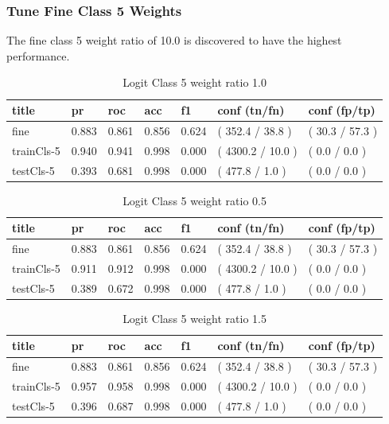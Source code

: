\documentclass[ms]{nuthesis}
\begin{document}
\subsubsection{Tune Fine Class 5 Weights}
\par The fine class 5 weight ratio of 10.0 is discovered to have the highest performance.
\FloatBarrier
\begin{table}[H]
\centering
\caption{Logit Class 5 weight ratio 1.0}
\label{tab:LogRegCls5-Wt1}
\begin{tabular}{|l||l||l||l||l||l||l|}\toprule
title & pr & roc & acc & f1 & conf (tn/fn) & conf (fp/tp) \\ \midrule
fine & 0.883 & 0.861 & 0.856 & 0.624 & ( 352.4 / 38.8 ) & ( 30.3 / 57.3 ) \\
trainCls-5 & 0.940 & 0.941 & 0.998 & 0.000 & ( 4300.2 / 10.0 ) & ( 0.0 / 0.0 ) \\
testCls-5 & 0.393 & 0.681 & 0.998 & 0.000 & ( 477.8 / 1.0 ) & ( 0.0 / 0.0 ) \\ \bottomrule
\end{tabular}
\end{table}
\FloatBarrier


\FloatBarrier
\begin{table}[H]
\centering
\caption{Logit Class 5 weight ratio 0.5}
\label{tab:LogRegCls5-Wtp5}
\begin{tabular}{|l||l||l||l||l||l||l|}\toprule
title & pr & roc & acc & f1 & conf (tn/fn) & conf (fp/tp) \\ \midrule
fine & 0.883 & 0.861 & 0.856 & 0.624 & ( 352.4 / 38.8 ) & ( 30.3 / 57.3 ) \\
trainCls-5 & 0.911 & 0.912 & 0.998 & 0.000 & ( 4300.2 / 10.0 ) & ( 0.0 / 0.0 ) \\
testCls-5 & 0.389 & 0.672 & 0.998 & 0.000 & ( 477.8 / 1.0 ) & ( 0.0 / 0.0 ) \\ \bottomrule
\end{tabular}
\end{table}
\FloatBarrier


\FloatBarrier
\begin{table}[H]
\centering
\caption{Logit Class 5 weight ratio 1.5}
\label{tab:LogRegCls5-Wt1p5}
\begin{tabular}{|l||l||l||l||l||l||l|}\toprule
title & pr & roc & acc & f1 & conf (tn/fn) & conf (fp/tp) \\ \midrule
fine & 0.883 & 0.861 & 0.856 & 0.624 & ( 352.4 / 38.8 ) & ( 30.3 / 57.3 ) \\
trainCls-5 & 0.957 & 0.958 & 0.998 & 0.000 & ( 4300.2 / 10.0 ) & ( 0.0 / 0.0 ) \\
testCls-5 & 0.396 & 0.687 & 0.998 & 0.000 & ( 477.8 / 1.0 ) & ( 0.0 / 0.0 ) \\ \bottomrule
\end{tabular}
\end{table}
\FloatBarrier
\end{document}

